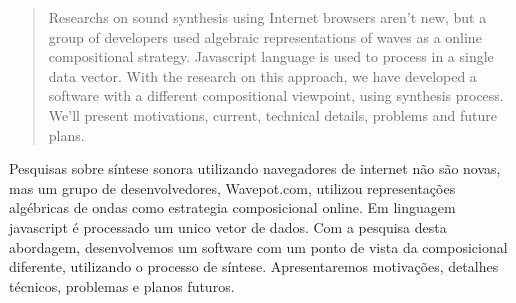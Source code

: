 \documentclass[12pt]{article}
\begin{document}
 

\maketitle


\begin{abstract}
Researchs on sound synthesis using Internet browsers aren't new,  but a group of developers used algebraic representations of waves as a online compositional strategy. Javascript language is used to process in a single data vector. With the research on this approach, we have developed a software with a different  compositional viewpoint, using synthesis process. We'll present motivations, current, technical details, problems and future plans.
\end{abstract}

\begin{resumo} 
Pesquisas sobre síntese sonora utilizando navegadores de internet não são novas, mas um grupo de desenvolvedores, Wavepot.com, utilizou representações algébricas de ondas como estrategia composicional online. Em linguagem javascript é processado um unico vetor de dados. Com a pesquisa desta abordagem, desenvolvemos um software com um ponto de vista da composicional diferente, utilizando o processo de síntese. Apresentaremos motivações, detalhes técnicos, problemas e planos futuros.
\end{resumo}







 


\end{document}
